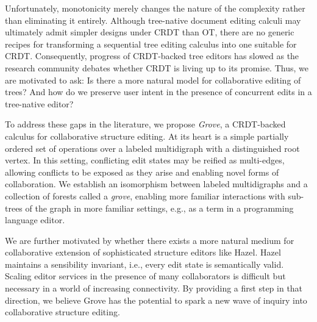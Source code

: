 Unfortunately, monotonicity merely changes the nature of the complexity rather than eliminating it entirely.
Although tree-native document editing calculi may ultimately admit simpler designs under CRDT than OT,
there are no generic recipes for transforming a sequential tree editing calculus into one suitable for CRDT.
Consequently, progress of CRDT-backed tree editors has slowed as the research community debates whether CRDT is living up to its promise.
Thus, we are motivated to ask:
Is there a more natural model for collaborative editing of trees?
And how do we preserve user intent in the presence of concurrent edits in a tree-native editor?

To address these gaps in the literature, we propose \emph{Grove}, a CRDT-backed calculus for collaborative structure editing.
At its heart is a simple partially ordered set of operations over a labeled multidigraph with a distinguished root vertex.
In this setting, conflicting edit states may be reified as multi-edges,
allowing conflicts to be exposed as they arise and enabling novel forms of collaboration.
We establish an isomorphism between labeled multidigraphs and a collection of forests called a \emph{grove},
enabling more familiar interactions with sub-trees of the graph in more familiar settings, e.g., as a term in a programming language editor.

We are further motivated by whether there exists a more natural medium for collaborative extension of sophisticated structure editors like Hazel.
Hazel maintains a sensibility invariant, i.e., every edit state is semantically valid.
Scaling editor services in the presence of many collaborators is difficult but necessary in a world of increasing connectivity.
By providing a first step in that direction,
we believe Grove has the potential to spark a new wave of inquiry into collaborative structure editing.







